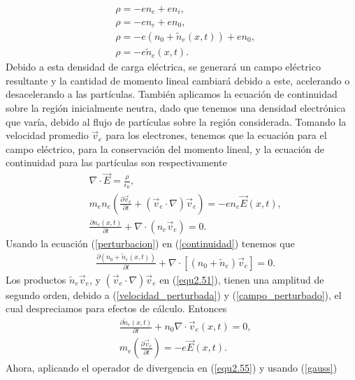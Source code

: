 \documentclass[../main.tex]{subfiles}
\begin{document}
        \begin{align}
            &\rho = -en_e+en_i, \\
            &\rho = -en_e+en_0, \\
            &\rho = -e(n_0 + \tilde{n}_e(x,t)) + en_0, \\
            &\rho = -e\tilde{n}_e(x,t).
        \end{align}
    Debido a esta densidad de carga eléctrica, se generará un campo eléctrico resultante y la cantidad de momento lineal cambiará debido a este, acelerando o desacelerando a las partículas. También aplicamos la ecuación de continuidad sobre la región inicialmente neutra, dado que tenemos una densidad electrónica que varía, debido al flujo de partículas sobre la región considerada. Tomando la velocidad promedio $\vec{v}_e$ para los electrones, tenemos que la ecuación para el campo eléctrico, para la conservación del momento lineal, y la ecuación de continuidad para las partículas son respectivamente
        \begin{align}
            &\nabla \cdot \vec{E} = \frac{\rho}{\epsilon_0}, \label{gauss}\\
            &m_en_e \left( \frac{\partial \vec{v}_e}{\partial t} + (\vec{v}_e \cdot \nabla)\vec{v}_e \right) = -en_e\vec{E}(x,t), \label{equ2.51}\\
            &\frac{\partial n_e(x,t)}{\partial t} + \nabla \cdot (n_e\vec{v}_e) = 0. \label{continuidad}
        \end{align}
        Usando la ecuación (\ref{perturbacion}) en (\ref{continuidad}) tenemos que
        \begin{align}
            &\frac{\partial \left(n_0 + \tilde{n}_e(x,t)\right)}{\partial t} + \nabla \cdot [(n_0+\tilde{n}_e)\vec{v}_e]= 0.
        \end{align}
    Los productos $\tilde{n}_e\vec{v}_e$, y $(\vec{v}_e \cdot \nabla)\vec{v}_e$ en (\ref{equ2.51}), tienen una amplitud de segundo orden, debido a (\ref{velocidad_perturbada}) y (\ref{campo_perturbado}), el cual despreciamos para efectos de cálculo. Entonces
        \begin{align}
            &\frac{\partial \tilde{n}_e(x,t)}{\partial t} + n_0\nabla \cdot \vec{v}_e(x,t) = 0, \label{equ2.54}\\
            &m_e \left( \frac{\partial \vec{v}_e}{\partial t} \right) = -e\vec{E}
            (x,t). \label{equ2.55}
        \end{align}
    Ahora, aplicando el operador de divergencia en (\ref{equ2.55}) y usando (\ref{gauss})
\end{document}
